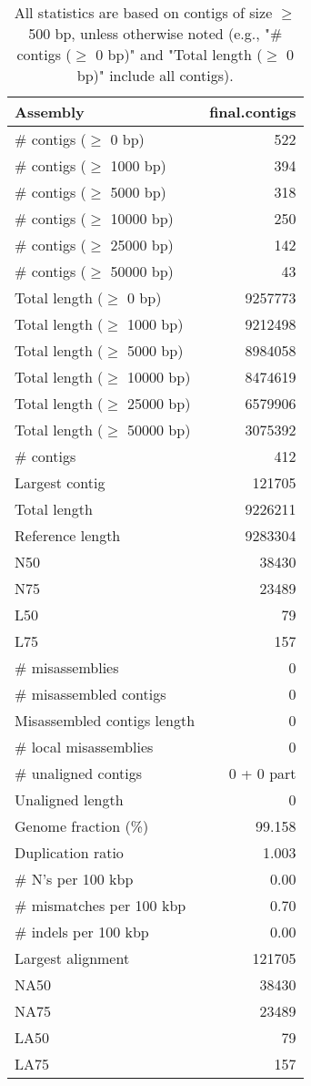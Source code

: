 \documentclass[12pt,a4paper]{article}
\begin{document}
\begin{table}[ht]
\begin{center}
\caption{All statistics are based on contigs of size $\geq$ 500 bp, unless otherwise noted (e.g., "\# contigs ($\geq$ 0 bp)" and "Total length ($\geq$ 0 bp)" include all contigs).}
\begin{tabular}{|l*{1}{|r}|}
\hline
Assembly & final.contigs \\ \hline
\# contigs ($\geq$ 0 bp) & 522 \\ \hline
\# contigs ($\geq$ 1000 bp) & 394 \\ \hline
\# contigs ($\geq$ 5000 bp) & 318 \\ \hline
\# contigs ($\geq$ 10000 bp) & 250 \\ \hline
\# contigs ($\geq$ 25000 bp) & 142 \\ \hline
\# contigs ($\geq$ 50000 bp) & 43 \\ \hline
Total length ($\geq$ 0 bp) & 9257773 \\ \hline
Total length ($\geq$ 1000 bp) & 9212498 \\ \hline
Total length ($\geq$ 5000 bp) & 8984058 \\ \hline
Total length ($\geq$ 10000 bp) & 8474619 \\ \hline
Total length ($\geq$ 25000 bp) & 6579906 \\ \hline
Total length ($\geq$ 50000 bp) & 3075392 \\ \hline
\# contigs & 412 \\ \hline
Largest contig & 121705 \\ \hline
Total length & 9226211 \\ \hline
Reference length & 9283304 \\ \hline
N50 & 38430 \\ \hline
N75 & 23489 \\ \hline
L50 & 79 \\ \hline
L75 & 157 \\ \hline
\# misassemblies & 0 \\ \hline
\# misassembled contigs & 0 \\ \hline
Misassembled contigs length & 0 \\ \hline
\# local misassemblies & 0 \\ \hline
\# unaligned contigs & 0 + 0 part \\ \hline
Unaligned length & 0 \\ \hline
Genome fraction (\%) & 99.158 \\ \hline
Duplication ratio & 1.003 \\ \hline
\# N's per 100 kbp & 0.00 \\ \hline
\# mismatches per 100 kbp & 0.70 \\ \hline
\# indels per 100 kbp & 0.00 \\ \hline
Largest alignment & 121705 \\ \hline
NA50 & 38430 \\ \hline
NA75 & 23489 \\ \hline
LA50 & 79 \\ \hline
LA75 & 157 \\ \hline
\end{tabular}
\end{center}
\end{table}
\end{document}
